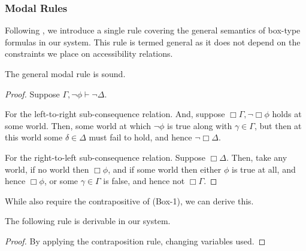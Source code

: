 \documentclass[10pt]{article}
\newcommand{\seq}{\ensuremath{>\!\!\!-}}
\begin{document}
\subsubsection{Modal Rules}
\label{sec:modal-rules}

Following \citeauthor{Jaspars:1996aa}, we introduce a single rule covering the general semantics of box-type formulas in our system.
This rule is termed general as it does not depend on the constraints we place on accessibility relations.


\begin{lemma}[Soundness]
  The general modal rule is sound.
  \begin{proof}
    Suppose \(\Gamma,\lnot\phi \vdash \lnot\Delta\).

    For the left-to-right sub-consequence relation. And, suppose \(\Box\Gamma, \lnot\Box\phi\) holds at some world. Then, some world at which \(\lnot\phi\) is true along with \(\gamma \in \Gamma\), but then at this world some \(\delta \in \Delta\) must fail to hold, and hence \(\lnot\Box\Delta\).

    For the right-to-left sub-consequence relation. Suppose \(\Box\Delta\). Then, take any world, if no world then \(\Box\phi\), and if some world then either \(\phi\) is true at all, and hence \(\Box\phi\), or some \(\gamma \in \Gamma\) is false, and hence not \(\Box\Gamma\).
  \end{proof}
\end{lemma}

While \citeauthor{Jaspars:1996aa} also require the contrapositive of (Box-1), we can derive this.

\begin{proposition}
  The following rule is derivable in our system.
  \begin{proof}
    By applying the contraposition rule, changing variables used.
  \end{proof}
\end{proposition}
\end{document}
